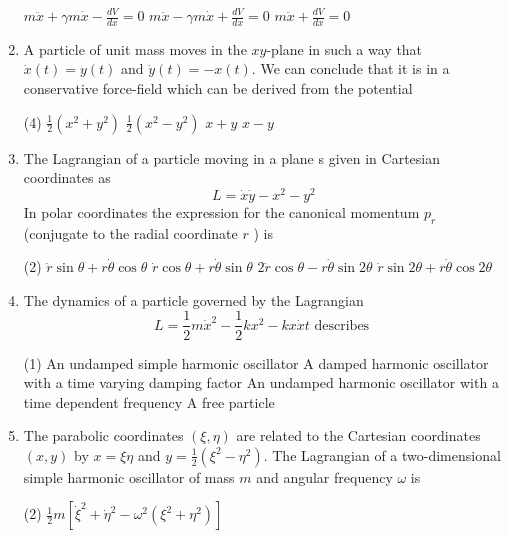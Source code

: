 \begin{enumerate}
\begin{tasks}
		\task[\textbf{B.}] $m \ddot{x}+\gamma m \dot{x}-\frac{d V}{d x}=0$
		\task[\textbf{C.}]  $m \ddot{x}-\gamma m \dot{x}+\frac{d V}{d x}=0$
		\task[\textbf{D.}] $m \ddot{x}+\frac{d V}{d x}=0$
	\end{tasks}
	\item A particle of unit mass moves in the $x y$-plane in such a way that $\dot{x}(t)=y(t)$ and $\dot{y}(t)=-x(t) .$ We can conclude that it is in a conservative force-field which can be derived from the potential
	{}
	\begin{tasks}(4)
		\task[\textbf{A.}] $\frac{1}{2}\left(x^{2}+y^{2}\right)$
		\task[\textbf{B.}] $\frac{1}{2}\left(x^{2}-y^{2}\right)$
		\task[\textbf{C.}] $x+y$
		\task[\textbf{D.}] $x-y$
	\end{tasks}	
	\item The Lagrangian of a particle moving in a plane s given in Cartesian coordinates as
	$$
	L=\dot{x} \dot{y}-x^{2}-y^{2}
	$$
	In polar coordinates the expression for the canonical momentum $p_{r}$ (conjugate to the radial coordinate $r$ ) is
	{}
	\begin{tasks}(2)
		\task[\textbf{A.}] $\dot{r} \sin \theta+r \dot{\theta} \cos \theta$
		\task[\textbf{B.}]  $\dot{r} \cos \theta+r \dot{\theta} \sin \theta$
		\task[\textbf{C.}] $2 \dot{r} \cos \theta-r \dot{\theta} \sin 2 \theta$
		\task[\textbf{D.}] $\dot{r} \sin 2 \theta+r \dot{\theta} \cos 2 \theta$
	\end{tasks}
	\item The dynamics of a particle governed by the Lagrangian
	$$
	L=\frac{1}{2} m \dot{x}^{2}-\frac{1}{2} k x^{2}-k x \dot{x} t \text { describes }
	$$
	{}
	\begin{tasks}(1)
		\task[\textbf{A.}] An undamped simple harmonic oscillator
		\task[\textbf{B.}] A damped harmonic oscillator with a time varying damping factor
		\task[\textbf{C.}]  An undamped harmonic oscillator with a time dependent frequency
		\task[\textbf{D.}] A free particle
	\end{tasks}	
	\item The parabolic coordinates $(\xi, \eta)$ are related to the Cartesian coordinates $(x, y)$ by $x=\xi \eta$ and $y=\frac{1}{2}\left(\xi^{2}-\eta^{2}\right)$. The Lagrangian of a two-dimensional simple harmonic oscillator of mass $m$ and angular frequency $\omega$ is
	{}
	\begin{tasks}(2)
		\task[\textbf{A.}] $\frac{1}{2} m\left[\dot{\xi}^{2}+\dot{\eta}^{2}-\omega^{2}\left(\xi^{2}+\eta^{2}\right)\right]$

\end{tasks}
\end{enumerate}
